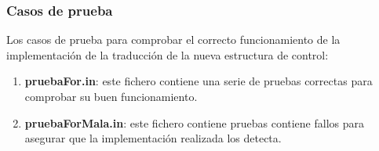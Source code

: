 \documentclass[12pt,a4paper, landscape]{article}
\theoremstyle{mytheor}
\begin{document}
\subsubsection{Casos de prueba}
Los casos de prueba para comprobar el correcto funcionamiento de la implementación de la traducción de la nueva estructura de control:
\begin{enumerate}
\item \textbf{pruebaFor.in}: este fichero contiene una serie de pruebas correctas para comprobar su buen funcionamiento.
\item \textbf{pruebaForMala.in}: este fichero contiene pruebas contiene fallos para asegurar que la implementación realizada los detecta.
\end{enumerate}
\end{document}
